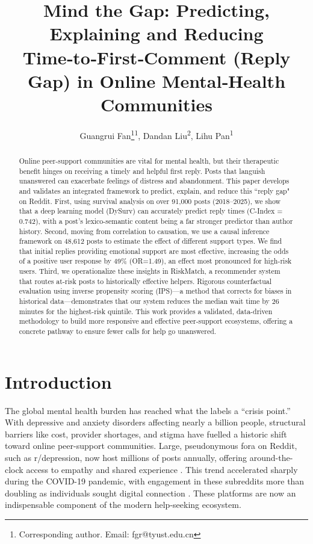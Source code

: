 \documentclass[letterpaper]{article} %
\title{Mind the Gap: Predicting, Explaining and Reducing Time‑to‑First‑Comment (Reply Gap) in Online Mental‑Health Communities}
\author{
    Guangrui Fan\thanks{Corresponding author. Email: fgr@tyust.edu.cn}\equalcontrib\textsuperscript{\rm 1},
    Dandan Liu\equalcontrib\textsuperscript{\rm 2},
    Lihu Pan\textsuperscript{\rm 1}
}
\begin{document}
\maketitle

\begin{abstract}
Online peer-support communities are vital for mental health, but their therapeutic benefit hinges on receiving a timely and helpful first reply. Posts that languish unanswered can exacerbate feelings of distress and abandonment. This paper develops and validates an integrated framework to predict, explain, and reduce this ``reply gap" on Reddit. First, using survival analysis on over 91,000 posts (2018–2025), we show that a deep learning model (DySurv) can accurately predict reply times (C-Index = 0.742), with a post's lexico-semantic content being a far stronger predictor than author history. Second, moving from correlation to causation, we use a causal inference framework on 48,612 posts to estimate the effect of different support types. We find that initial replies providing emotional support are most effective, increasing the odds of a positive user response by 49\% (OR=1.49), an effect most pronounced for high-risk users. Third, we operationalize these insights in RiskMatch, a recommender system that routes at-risk posts to historically effective helpers. Rigorous counterfactual evaluation using inverse propensity scoring (IPS)—a method that corrects for biases in historical data—demonstrates that our system reduces the median wait time by 26 minutes for the highest-risk quintile. This work provides a validated, data-driven methodology to build more responsive and effective peer-support ecosystems, offering a concrete pathway to ensure fewer calls for help go unanswered.
\end{abstract}



\section{Introduction}
The global mental health burden has reached what the \citet{world2022world} labels a “crisis point.” With depressive and anxiety disorders affecting nearly a billion people, structural barriers like cost, provider shortages, and stigma have fuelled a historic shift toward online peer-support communities. Large, pseudonymous fora on Reddit, such as r/depression, now host millions of posts annually, offering around-the-clock access to empathy and shared experience \cite{richard2022scoping}. This trend accelerated sharply during the COVID-19 pandemic, with engagement in these subreddits more than doubling as individuals sought digital connection \cite{zhu2023investigating}. These platforms are now an indispensable component of the modern help-seeking ecosystem.
\end{document}
